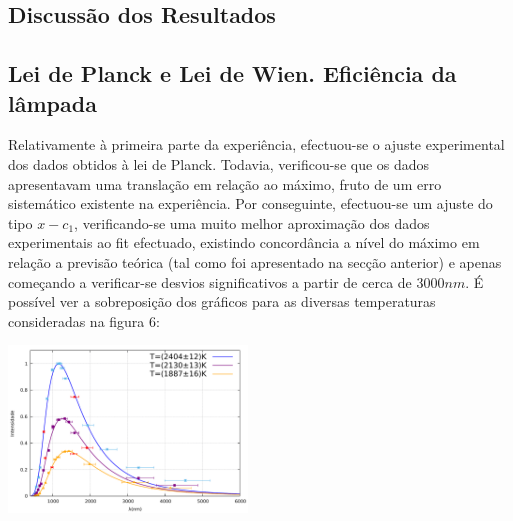 \documentclass[9pt]{extarticle}
\begin{document}
\begin{multicols}{2}


\section{Discussão dos Resultados}

\subsection{Lei de Planck e Lei de Wien. Eficiência da lâmpada}

\par Relativamente à primeira parte da experiência, efectuou-se o ajuste experimental dos dados obtidos à lei de Planck. Todavia, verificou-se que os dados apresentavam uma translação em relação ao máximo, fruto de um erro sistemático existente na experiência. Por conseguinte, efectuou-se um ajuste do tipo $x-c_1$, verificando-se uma muito melhor aproximação dos dados experimentais ao fit efectuado, existindo concordância a nível do máximo em relação a previsão teórica (tal como foi apresentado na secção anterior) e apenas começando a verificar-se desvios significativos a partir de cerca de $3000nm$. É possível ver a sobreposição dos gráficos para as diversas temperaturas consideradas na figura 6:

\begin{center}
\includegraphics[width=180pt]{espetroT.pdf}
\par{}
\end{center}


\end{multicols}
\end{document}
